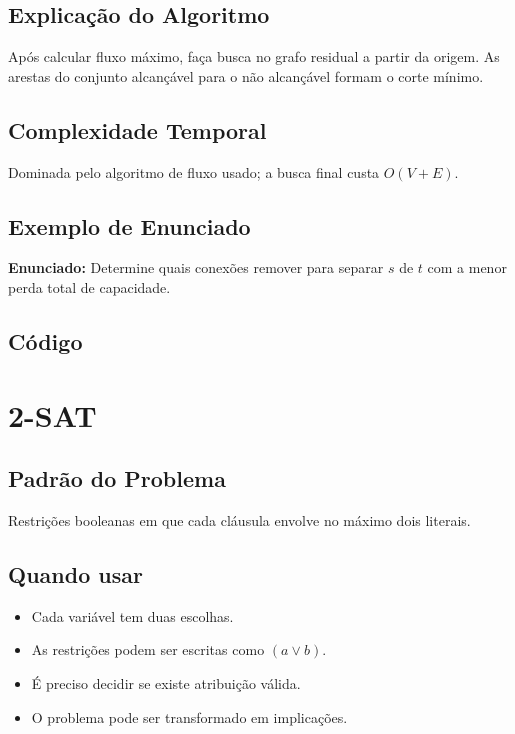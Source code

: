 \subsection{Explicação do Algoritmo}
Após calcular fluxo máximo, faça busca no grafo residual a partir da origem. As arestas do conjunto alcançável para o não alcançável formam o corte mínimo.

\subsection{Complexidade Temporal}
Dominada pelo algoritmo de fluxo usado; a busca final custa $O(V + E)$.

\subsection{Exemplo de Enunciado}
\begin{exemplodiabox}
\textbf{Enunciado:} Determine quais conexões remover para separar $s$ de $t$ com a menor perda total de capacidade.
\end{exemplodiabox}

\subsection{Código}

\section{2-SAT}

\subsection{Padrão do Problema}
Restrições booleanas em que cada cláusula envolve no máximo dois literais.

\subsection{Quando usar}
\begin{itemize}[nosep]
  \item Cada variável tem duas escolhas.
  \item As restrições podem ser escritas como $(a \vee b)$.
  \item É preciso decidir se existe atribuição válida.
  \item O problema pode ser transformado em implicações.
\end{itemize}

